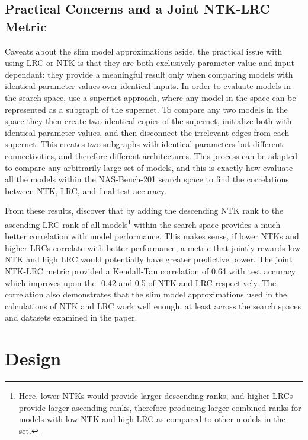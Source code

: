 \subsection{Practical Concerns and a Joint NTK-LRC Metric}\label{sect:ntk_practical_concerns}
Caveats about the slim model approximations aside, the practical issue with using LRC or NTK
is that they are both exclusively parameter-value and input dependant:
they provide a meaningful result only when comparing models with identical parameter values over identical inputs.
In order to evaluate models in the search space, \citeauthor{chen2021} use a supernet approach, where any model in the space
can be represented as a subgraph of the supernet. To compare any two models in the space they then create two
identical copies of the supernet, initialize both with
identical parameter values, and then disconnect the irrelevant edges from each supernet. This creates two subgraphs
with identical parameters but different connectivities, and therefore different architectures. This process can
be adapted to compare any arbitrarily large set of models, and this is exactly how \citeauthor{chen2021} evaluate
all the models within the NAS-Bench-201 search space to find the correlations between NTK, LRC, and final test accuracy.

From these results, \citeauthor{chen2021} discover that by adding the descending NTK rank to the ascending LRC rank
of all models\footnote{Here, lower NTKs would provide larger descending ranks, and higher LRCs provide larger ascending
ranks, therefore producing larger combined ranks for models with low NTK and high LRC as compared to other models in the set.}
within the search space provides
a much better correlation with model performance. This makes sense,
if lower NTKs and higher LRCs correlate with better performance, a metric that jointly
rewards low NTK and high LRC would potentially have greater predictive power. The joint NTK-LRC metric
provided a Kendall-Tau correlation of 0.64 with test accuracy which improves upon the -0.42 and 0.5 of NTK and LRC respectively.
The correlation also demonstrates that the slim model approximations used in the calculations of NTK and LRC work well enough,
at least across the search spaces and datasets examined in the paper.

\section{Design}\label{sect:spiderdesign}
